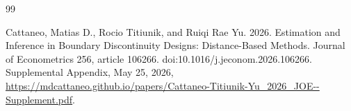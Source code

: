\documentclass{article}
\begin{document}
\begin{thebibliography}{99}

   Cattaneo, Matias D., Rocio Titiunik, and Ruiqi Rae Yu. 2026. Estimation and Inference in Boundary Discontinuity Designs: Distance-Based Methods. Journal of Econometrics 256, article 106266. doi:10.1016/j.jeconom.2026.106266. Supplemental Appendix, May 25, 2026, \url{https://mdcattaneo.github.io/papers/Cattaneo-Titiunik-Yu\_2026\_JOE--Supplement.pdf}.

\end{thebibliography}
\end{document}
